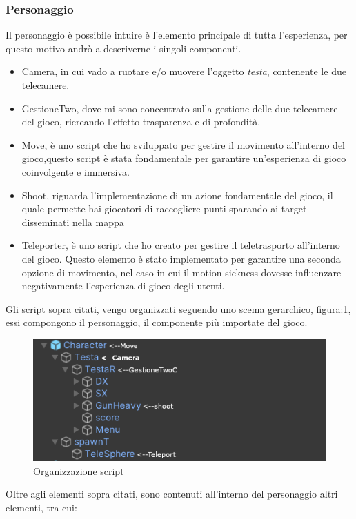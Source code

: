 \documentclass[
a4paper,
cleardoublepage=empty,
headings=twolinechapter,
numbers=autoenddot,
]{scrbook}
\begin{document}
    \subsubsection{Personaggio}
    Il personaggio è possibile intuire è l'elemento principale di tutta l'esperienza, per questo motivo andrò a descriverne i singoli componenti.
    \begin{itemize}
        \item Camera, in cui vado a ruotare e/o muovere l'oggetto \textit{testa}, contenente le due telecamere.
        \item GestioneTwo, dove mi sono concentrato sulla gestione delle due telecamere del gioco, ricreando l'effetto trasparenza e di profondità.
        \item Move, è uno script che ho sviluppato per gestire il movimento all'interno del gioco,questo script è stata fondamentale per garantire un'esperienza di gioco coinvolgente e immersiva.
        \item Shoot, riguarda l'implementazione di un azione fondamentale del gioco, il quale permette hai giocatori di raccogliere punti sparando ai target disseminati nella mappa
        \item Teleporter, è uno script che ho creato per gestire il teletrasporto all'interno del gioco. Questo elemento è stato implementato per garantire una seconda opzione di movimento, nel caso in cui il motion sickness\cite{mottion_sickness} dovesse influenzare negativamente l'esperienza di gioco degli utenti.
    \end{itemize}
    Gli script sopra citati, vengo organizzati seguendo uno scema gerarchico, figura:\ref{fig:script_character}, essi compongono il personaggio, il componente più importate del gioco.
    \begin{figure}[H]
    	\centering
    	\includegraphics[width=0.8\linewidth]{image/script_character}
    	\caption{Organizzazione script}
    	\label{fig:script_character}
    \end{figure}
    Oltre agli elementi sopra citati, sono contenuti all'interno del personaggio altri elementi, tra cui:
\end{document}
